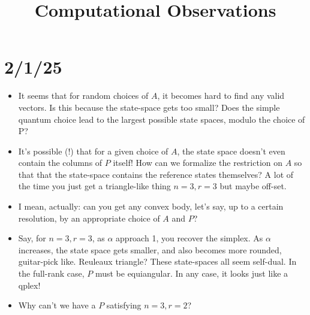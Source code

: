 \documentclass[11pt]{article}
\title{Computational Observations}
\begin{document}
\maketitle

\section{2/1/25}
\begin{itemize}
\item It seems that for random choices of $A$, it becomes hard to find any valid vectors. Is this because the state-space gets too small? Does the simple quantum choice lead to the largest possible state spaces, modulo the choice of P?
\item It's possible (!) that for a given choice of $A$, the state space doesn't even contain the columns of $P$ itself! How can we formalize the restriction on $A$ so that that the state-space contains the reference states themselves? A lot of the time you just get a triangle-like thing $n=3, r=3$ but maybe off-set.
\item I mean, actually: can you get any convex body, let's say, up to a certain resolution, by an appropriate choice of $A$ and $P$?
\item Say, for $n=3, r=3$, as $\alpha$ approach 1, you recover the simplex. As $\alpha$ increases, the state space gets smaller, and also becomes more rounded, guitar-pick like. Reuleaux triangle? These state-spaces all seem self-dual. In the full-rank case, $P$ must be equiangular. In any case, it looks just like a qplex!
\item Why can't we have a $P$ satisfying $n=3, r=2$?
\end{itemize}
\end{document}

